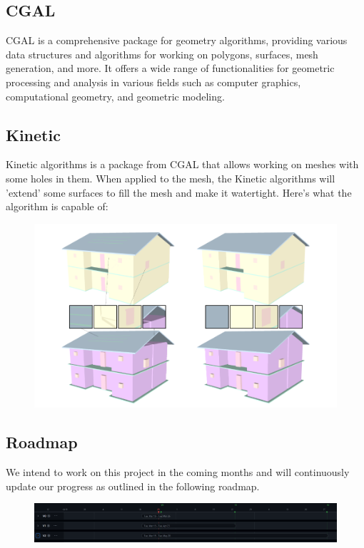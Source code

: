 \documentclass{article}
\begin{document}
\subsection{CGAL}
CGAL is a comprehensive package for geometry algorithms, providing various data structures and algorithms for working on polygons, surfaces, mesh generation, and more.
It offers a wide range of functionalities for geometric processing and analysis in various fields such as computer graphics, computational geometry, and geometric modeling.
\subsection{Kinetic}

Kinetic algorithms is a package from CGAL that allows working on meshes with some holes in them. When applied to the mesh, the Kinetic algorithms will 'extend' some surfaces to fill the mesh and make it watertight. 
Here's what the algorithm is capable of:


\begin{figure}[h]
    
\includegraphics[scale =   0.3 ]{../../images/example_algorithm.png}

\end{figure}
\subsection{Roadmap}
We intend to work on this project in the coming months and will continuously update our progress as outlined in the following roadmap.
\begin{figure}[h]
    
    \includegraphics[scale =   0.3 ]{../../images/roadmap.png}
    
    \end{figure}
    
\nocite{*}


\end{document}
